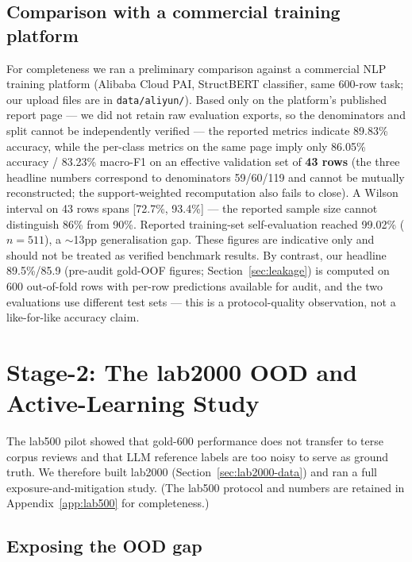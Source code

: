 \documentclass[11pt,a4paper]{article}
\newcommand{\code}[1]{\texttt{#1}}
\begin{document}
\subsection{Comparison with a commercial training platform}

For completeness we ran a preliminary comparison against a commercial
NLP training platform (Alibaba Cloud PAI, StructBERT classifier, same
600-row task; our upload files are in \code{data/aliyun/}). Based only
on the platform's published report page --- we did not retain raw
evaluation exports, so the denominators and split cannot be
independently verified --- the reported metrics indicate 89.83\%
accuracy, while the per-class metrics on the same page imply only
86.05\% accuracy / 83.23\% macro-F1 on an effective validation set of
\textbf{43 rows} (the three headline numbers correspond to denominators
59/60/119 and cannot be mutually reconstructed; the support-weighted
recomputation also fails to close). A Wilson interval on 43 rows spans
[72.7\%, 93.4\%] --- the reported sample size cannot distinguish 86\%
from 90\%. Reported training-set self-evaluation reached 99.02\%
($n=511$), a $\sim$13pp generalisation gap. These figures are
indicative only and should not be treated as verified benchmark
results. By contrast, our headline 89.5\%/85.9 (pre-audit gold-OOF
figures; Section~\ref{sec:leakage}) is computed on 600 out-of-fold rows
with per-row predictions available for audit, and the two evaluations
use different test sets --- this is a protocol-quality observation,
not a like-for-like accuracy claim.

\section{Stage-2: The lab2000 OOD and Active-Learning Study}
\label{sec:lab2000}

The lab500 pilot showed that gold-600 performance does not transfer to
terse corpus reviews and that LLM reference labels are too noisy to
serve as ground truth. We therefore built lab2000
(Section~\ref{sec:lab2000-data}) and ran a full
exposure-and-mitigation study. (The lab500 protocol and numbers are
retained in Appendix~\ref{app:lab500} for completeness.)

\subsection{Exposing the OOD gap}
\label{sec:ood-expose}
\end{document}
